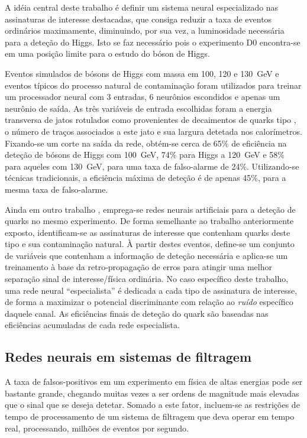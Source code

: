 A idéia central deste trabalho é definir um sistema neural especializado nas
assinaturas de interesse destacadas, que consiga reduzir a taxa de eventos
ordinários maximamente, diminuindo, por sua vez, a luminosidade necessária
para a deteção do Higgs. Isto se faz necessário pois o experimento D0
encontra-se em uma posição limite para o estudo do bóson de Higgs. 

Eventos simulados de bósons de Higgs com massa em 100, 120 e 130~GeV e eventos
típicos do processo natural de contaminação foram utilizados para treinar um
processador neural com 3 entradas, 6 neurônios escondidos e apenas um neurônio
de saída. As três variáveis de entrada escolhidas foram a energia transversa
de jatos rotulados como provenientes de decaimentos de quarks tipo
, o número de traços associados a este jato e sua largura detetada
nos calorímetros. Fixando-se um corte na saída da rede, obtém-se cerca de 65\%
de eficiência na deteção de bósons de Higgs com 100~GeV, 74\% para Higgs a
120~GeV e 58\% para aqueles com 130~GeV, para uma taxa de falso-alarme de
24\%. Utilizando-se técnicas tradicionais, a eficiência máxima de deteção é de
apenas 45\%, para a mesma taxa de falso-alarme.

Ainda em outro trabalho \cite{dudko-acat-2001}, emprega-se redes neurais
artificiais para a deteção de  quarks no mesmo experimento. De forma
semelhante ao trabalho anteriormente exposto, identificam-se as assinaturas
de interesse que contenham quarks deste tipo e sua contaminação natural. À
partir destes eventos, define-se um conjunto de variáveis que contenham a
informação de deteção necessária e aplica-se um treinamento à base da
retro-propagação de erros para atingir uma melhor separação sinal de
interesse/física ordinária. No caso específico deste trabalho, uma rede neural
``especialista'' é dedicada a cada tipo de assinatura de interesse, de forma a
maximizar o potencial discriminante com relação ao \textit{ruído} específico
daquele canal. As eficiências finais de deteção do  quark são
baseadas nas eficiências acumuladas de cada rede especialista.

\subsection{Redes neurais em sistemas de filtragem}

A taxa de falsos-positivos em um experimento em física de altas energias pode
ser bastante grande, chegando muitas vezes a ser ordens de magnitude mais
elevadas que o sinal que se deseja detetar. Somado a este fator, incluem-se as
restrições de tempo de processamento de um sistema de filtragem que deva
operar em tempo real, processando, milhões de eventos por segundo.

